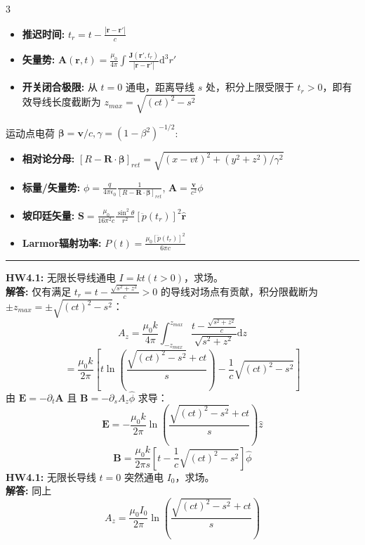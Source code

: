 \documentclass[9pt,a4paper]{article} %
\newcommand{\p}{\partial}
\newcommand{\diff}{\mathrm{d}}
\newcommand{\mbf}[1]{\mathbf{#1}}
\begin{document}
\vspace{-2ex} %

\begin{multicols*}{3} %

\begin{itemize}
    \item \textbf{推迟时间:} $t_r = t - \frac{|\mbf{r} - \mbf{r}'|}{c}$
    \item \textbf{矢量势:} $\mbf{A}(\mbf{r}, t) = \frac{\mu_0}{4\pi} \int \frac{\mbf{J}(\mbf{r}', t_r)}{|\mbf{r} - \mbf{r}'|} \diff^3r'$
    \item \textbf{开关闭合极限:} 从 $t=0$ 通电，距离导线 $s$ 处，积分上限受限于 $t_r > 0$，即有效导线长度截断为 $z_{max} = \sqrt{(ct)^2 - s^2}$
\end{itemize}

运动点电荷 $\mbf{\beta} = \mbf{v}/c, \gamma = (1-\beta^2)^{-1/2}$:
\begin{itemize}
    \item \textbf{相对论分母:} $[R - \mbf{R}\cdot\mbf{\beta}]_{ret} = \sqrt{(x-vt)^2 + (y^2+z^2)/\gamma^2}$
    \item \textbf{标量/矢量势:} $\phi = \frac{q}{4\pi\epsilon_0} \frac{1}{[R - \mbf{R}\cdot\mbf{\beta}]_{ret}}$, $\mbf{A} = \frac{\mbf{v}}{c^2} \phi$
\end{itemize}

\begin{itemize}
    \item \textbf{坡印廷矢量:} $\mbf{S} = \frac{\mu_0}{16\pi^2 c} \frac{\sin^2\theta}{r^2} [\ddot{p}(t_r)]^2 \hat{\mbf{r}}$
    \item \textbf{Larmor辐射功率:} $P(t) = \frac{\mu_0 [\ddot{p}(t_r)]^2}{6\pi c}$
\end{itemize}

\vspace{1ex}\hrule\vspace{1ex}
\noindent\textbf{HW4.1:} 无限长导线通电 $I=kt(t>0)$，求场。\\
\textbf{解答:} 仅有满足 $t_r = t - \frac{\sqrt{s^2+z^2}}{c} > 0$ 的导线对场点有贡献，积分限截断为 $\pm z_{max} = \pm \sqrt{(ct)^2 - s^2}$：
$$ A_z = \frac{\mu_0 k}{4\pi} \int_{-z_{max}}^{z_{max}} \frac{t - \frac{\sqrt{s^2+z^2}}{c}}{\sqrt{s^2 + z^2}} \diff z $$
$$= \frac{\mu_0 k}{2\pi} \left[ t \ln\left( \frac{\sqrt{(ct)^2 - s^2} + ct}{s} \right) - \frac{1}{c}\sqrt{(ct)^2 - s^2} \right] $$
由 $\mbf{E} = -\p_t \mbf{A}$ 且 $\mbf{B} = -\p_s A_z \hat{\phi}$ 求导：
$$ \mbf{E} = - \frac{\mu_0 k}{2\pi} \ln\left( \frac{\sqrt{(ct)^2 - s^2} + ct}{s} \right) \hat{z}$$
$$\mbf{B} = \frac{\mu_0 k}{2\pi s} \left[ t - \frac{1}{c}\sqrt{(ct)^2 - s^2} \right] \hat{\phi} $$
\textbf{HW4.1:} 无限长导线 $t=0$ 突然通电 $I_0$，求场。\\
\textbf{解答:} 同上
$$ A_z =  \frac{\mu_0 I_0}{2\pi} \ln\left( \frac{\sqrt{(ct)^2 - s^2} + ct}{s} \right)$$


\end{multicols*}
\end{document}
